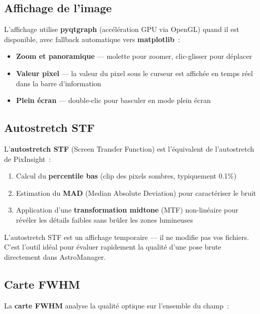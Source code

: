 \documentclass[a4paper,11pt]{article}
\begin{document}
\subsection{Affichage de l'image}

L'affichage utilise \textbf{pyqtgraph} (acc\'{e}l\'{e}ration GPU via OpenGL) quand il est disponible, avec fallback automatique vers \textbf{matplotlib}~:

\begin{itemize}
    \item \textbf{Zoom et panoramique} --- molette pour zoomer, clic-glisser pour d\'{e}placer
    \item \textbf{Valeur pixel} --- la valeur du pixel sous le curseur est affich\'{e}e en temps r\'{e}el dans la barre d'information
    \item \textbf{Plein \'{e}cran} --- double-clic pour basculer en mode plein \'{e}cran
\end{itemize}

\subsection{Autostretch STF}

L'\textbf{autostretch STF} (Screen Transfer Function) est l'\'{e}quivalent de l'autostretch de PixInsight~:

\begin{enumerate}
    \item Calcul du \textbf{percentile bas} (clip des pixels sombres, typiquement 0.1\%)
    \item Estimation du \textbf{MAD} (Median Absolute Deviation) pour caract\'{e}riser le bruit
    \item Application d'une \textbf{transformation midtone} (MTF) non-lin\'{e}aire pour r\'{e}v\'{e}ler les d\'{e}tails faibles sans br\^{u}ler les zones lumineuses
\end{enumerate}

\begin{tipbox}
L'autostretch STF est un affichage temporaire --- il ne modifie pas vos fichiers. C'est l'outil id\'{e}al pour \'{e}valuer rapidement la qualit\'{e} d'une pose brute directement dans AstroManager.
\end{tipbox}

\subsection{Carte FWHM}

La \textbf{carte FWHM} analyse la qualit\'{e} optique sur l'ensemble du champ~:
\end{document}
